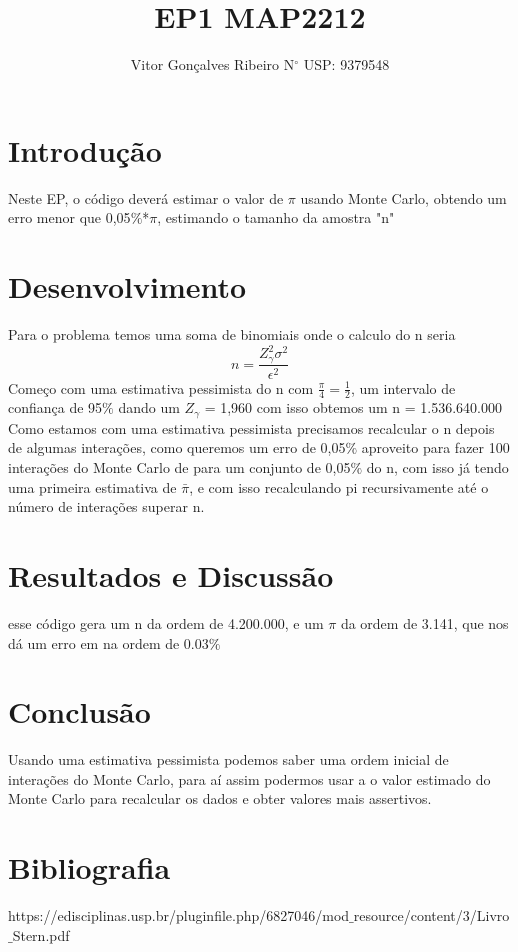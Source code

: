 \documentclass[]{article}
\title{EP1 MAP2212}
\author{Vitor Gon\c{c}alves Ribeiro N$^\circ$ USP: 9379548}
\begin{document}
\maketitle

\section{Introdu\c{c}\~{a}o}
   Neste EP, o c\'{o}digo dever\'{a} estimar o valor de $\pi$ usando Monte Carlo, obtendo um erro menor que 0,05$\%$*$\pi$, estimando o tamanho da amostra "n"
\section{Desenvolvimento}
   Para o problema temos uma soma de binomiais onde o calculo do n seria 
   \begin{equation} 
	n = \frac{Z_{\gamma}^2 \sigma^2}{\epsilon^2}
   \end{equation}
   Come\c{c}o com uma estimativa pessimista do n com $\frac{\pi}{4} = \frac{1}{2}$, um intervalo de confian\c{c}a de 95$\%$ dando um $Z_{\gamma}$ = 1,960 com isso obtemos um n = 1.536.640.000
   Como estamos com uma estimativa pessimista precisamos recalcular o n depois de algumas interações, como queremos um erro de 0,05$\%$ aproveito para fazer 100 interações do Monte Carlo de para um conjunto de 0,05$\%$ do n, com isso já tendo uma primeira estimativa de $\bar{\pi}$, e com isso recalculando pi recursivamente até o número de interações superar n.
\section{Resultados e Discuss\~{a}o}
   esse c\'{o}digo gera um n da ordem de 4.200.000, e um $\pi$ da ordem de 3.141, que nos d\'{a} um erro em na ordem de 0.03$\%$
\section{Conclus\~{a}o}
    Usando uma estimativa pessimista podemos saber uma ordem inicial de interações do Monte Carlo, para aí assim podermos usar a o valor estimado do Monte Carlo para recalcular os dados e obter valores mais assertivos.
\section{Bibliografia}
   https://edisciplinas.usp.br/pluginfile.php/6827046/mod$\_$resource/content/3/Livro$\_$Stern.pdf
\end{document}
